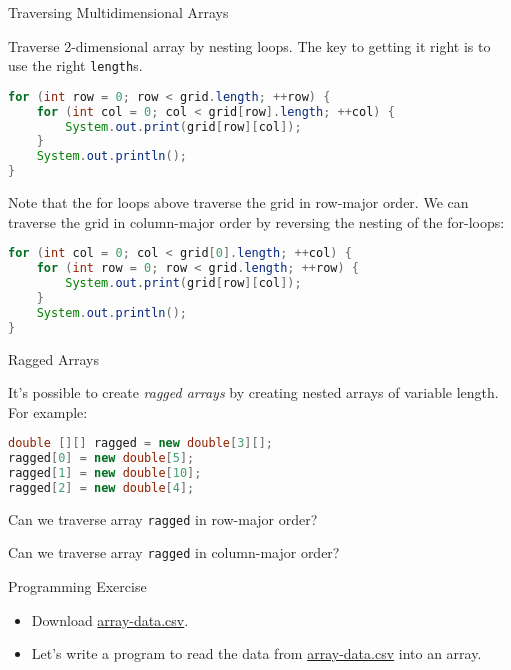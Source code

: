 \documentclass[xcolor={table}]{beamer}
\newcommand{\code}{http://www.cc.gatech.edu/~simpkins/teaching/gatech/cs1331/code}
\begin{document}
\begin{frame}[fragile]{Traversing Multidimensional Arrays}


Traverse 2-dimensional array by nesting loops.  The key to getting it right is to use the right {\tt length}s.
\begin{lstlisting}[language=Java]
for (int row = 0; row < grid.length; ++row) {
    for (int col = 0; col < grid[row].length; ++col) {
        System.out.print(grid[row][col]);
    }
    System.out.println();
}
\end{lstlisting}
Note that the for loops above traverse the grid in row-major order.  We can traverse the grid in column-major order by reversing the nesting of the for-loops:
\begin{lstlisting}[language=Java]
for (int col = 0; col < grid[0].length; ++col) {
    for (int row = 0; row < grid.length; ++row) {
        System.out.print(grid[row][col]);
    }
    System.out.println();
}
\end{lstlisting}


\end{frame}


\begin{frame}[fragile]{Ragged Arrays}


It's possible to create {\it ragged arrays} by creating nested arrays of variable length.  For example:
\begin{lstlisting}[language=Java]
double [][] ragged = new double[3][];
ragged[0] = new double[5];
ragged[1] = new double[10];
ragged[2] = new double[4];
\end{lstlisting}

Can we traverse array {\tt ragged} in row-major order?

Can we traverse array {\tt ragged} in column-major order?

\end{frame}

\begin{frame}[fragile]{Programming Exercise}

\begin{itemize}
\item Download \href{\code/array-data.csv}{array-data.csv}.
\item Let's write a program to read the data from \href{\code/array-data.csv}{array-data.csv} into an array.
\end{itemize}

\end{frame}
\end{document}
